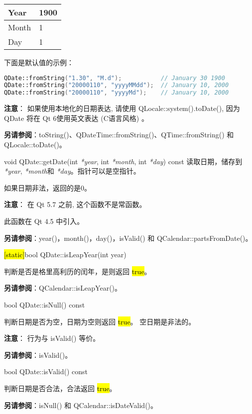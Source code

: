 \begin{tabular}{|l|l|}
\hline
Year&	1900\\
\hline
Month&	1\\
\hline
Day&	1\\
\hline
\end{tabular}

下面是默认值的示例：

\begin{lstlisting}[language=C++]
QDate::fromString("1.30", "M.d");           // January 30 1900
QDate::fromString("20000110", "yyyyMMdd");  // January 10, 2000
QDate::fromString("20000110", "yyyyMd");    // January 10, 2000
\end{lstlisting}

\textbf{注意}： 如果使用本地化的日期表达, 请使用 QLocale::system().toDate(), 因为 QDate 将在 Qt 6使用英文表达 (C语言风格) 。

\textbf{另请参阅}：toString()、QDateTime::fromString()、QTime::fromString() 和 QLocale::toDate()。

\splitLine

void QDate::getDate(int  \emph{*year}, int \emph{*month}, int \emph{*day}) const
读取日期，储存到 \emph{*year},  \emph{*month}和 \emph{*day}。指针可以是空指针。

如果日期非法，返回的是0。

\textbf{注意}： 在 Qt 5.7 之前, 这个函数不是常函数。

此函数在 Qt 4.5 中引入。

\textbf{另请参阅}：year()，month()，day()，isValid() 和
QCalendar::partsFromDate()。

\splitLine

\hl{[static]}bool QDate::isLeapYear(int year)

判断是否是格里高利历的闰年，是则返回 \hl{true}。

\textbf{另请参阅}：QCalendar::isLeapYear()。

\splitLine

bool QDate::isNull() const

判断日期是否为空，日期为空则返回 \hl{true}。 空日期是非法的。

\textbf{注意}： 行为与 isValid() 等价。

\textbf{另请参阅}：isValid()。

\splitLine

bool QDate::isValid() const

判断日期是否合法，合法返回 \hl{true}。

\textbf{另请参阅}：isNull() 和 QCalendar::isDateValid()。

